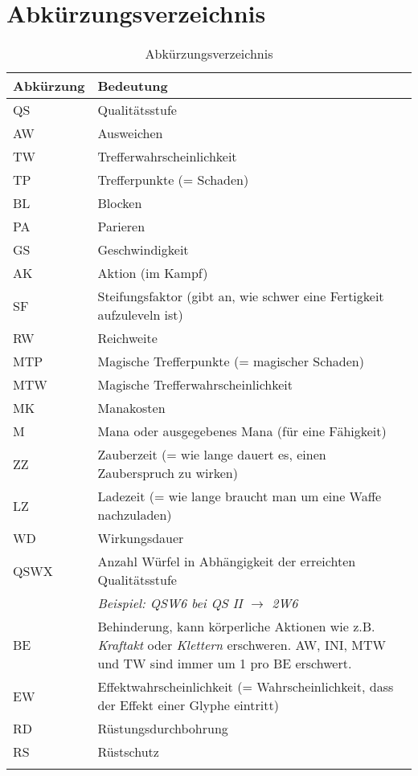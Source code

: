 \chapter{Abkürzungsverzeichnis}
\begin{longtable}{|p{3cm}|p{12cm}|}
\hline
\textbf{Abkürzung} & \textbf{Bedeutung} \\ \hline
QS & Qualitätsstufe \\ \hline
AW & Ausweichen \\ \hline
TW & Trefferwahrscheinlichkeit \\ \hline
TP & Trefferpunkte (= Schaden) \\ \hline
BL & Blocken \\ \hline
PA & Parieren \\ \hline
GS & Geschwindigkeit \\ \hline
AK & Aktion (im Kampf) \\ \hline
SF & Steifungsfaktor (gibt an, wie schwer eine Fertigkeit aufzuleveln ist) \\ \hline
RW & Reichweite \\ \hline
MTP & Magische Trefferpunkte (= magischer Schaden) \\ \hline
MTW & Magische Trefferwahrscheinlichkeit \\ \hline
MK & Manakosten \\ \hline
M & Mana oder ausgegebenes Mana (für eine Fähigkeit) \\ \hline
ZZ & Zauberzeit (= wie lange dauert es, einen Zauberspruch zu wirken) \\ \hline
LZ & Ladezeit (= wie lange braucht man um eine Waffe nachzuladen) \\ \hline
WD & Wirkungsdauer \\ \hline
QSWX & Anzahl Würfel in Abhängigkeit der erreichten Qualitätsstufe \\
& \textit{Beispiel: QSW6 bei QS II $\rightarrow$ 2W6} \\ \hline
BE & Behinderung, kann körperliche Aktionen wie z.B. \textit{Kraftakt} oder \textit{Klettern} erschweren. AW, INI, MTW und TW sind immer um 1 pro BE erschwert. \\ \hline
EW & Effektwahrscheinlichkeit (= Wahrscheinlichkeit, dass der Effekt einer Glyphe eintritt) \\ \hline
RD & Rüstungsdurchbohrung \\ \hline
RS & Rüstschutz \\ \hline

\caption{Abkürzungsverzeichnis}
\label{tab:Abkuerungsverzeichnis}
\end{longtable}
